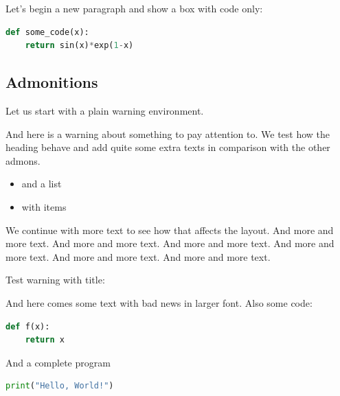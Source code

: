 \documentclass[%
oneside,                 %
final,                   %
10pt]{article}
\newenvironment{graybox2admon}[1][]{
\begin{graybox2mdframed}[frametitle=#1]
}
{
\end{graybox2mdframed}
}
\begin{document}
Let's begin a new paragraph and show a box with code only:

\begin{center}
\begin{Sbox}
\begin{minipage}{0.85\linewidth}
\begin{lstlisting}[language=Python,style=simple,xleftmargin=2mm]
def some_code(x):
    return sin(x)*exp(1-x)

\end{lstlisting}
\end{minipage}
\end{Sbox}
\fbox{\TheSbox}
\end{center}
\subsection{Admonitions}
Let us start with a plain warning environment.


\begin{graybox2admon}[Warning.]
And here is a warning about something to pay attention to. We
test how the heading behave and add quite some extra texts
in comparison with the other admons.
\begin{itemize}
  \item and a list
  \item with items
\end{itemize}
\noindent
We continue with more text to see how that affects the layout.
And more and more text.
And more and more text.
And more and more text.
And more and more text.
And more and more text.
And more and more text.
\end{graybox2admon}



Test warning with title:


\begin{graybox2admon}[{\large Title ending with math $\sqrt{2}\approx 1.4$}.]
{\large And here comes some text with bad news in larger font.
Also some code:
\begin{lstlisting}[language=Python,style=simple,xleftmargin=2mm]
def f(x):
    return x

\end{lstlisting}

And a complete program
\begin{lstlisting}[language=Python,style=simple,xleftmargin=2mm]
print("Hello, World!")

\end{lstlisting}
\par}
\end{graybox2admon}
\end{document}
